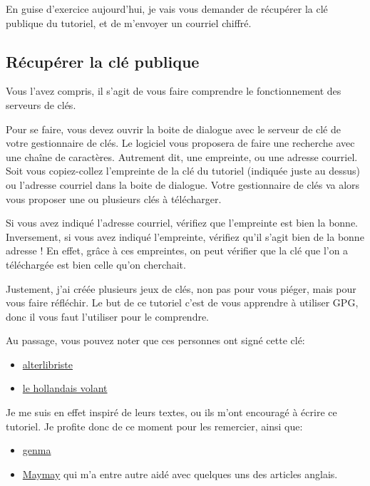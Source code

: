 En guise d'exercice aujourd'hui, je vais vous demander de récupérer la
clé publique du tutoriel, et de m'envoyer un courriel chiffré.

\subsection{Récupérer la clé
publique}\label{ruxe9cupuxe9rer-la-cluxe9-publique}

Vous l'avez compris, il s'agit de vous faire comprendre le
fonctionnement des serveurs de clés.

Pour se faire, vous devez ouvrir la boite de dialogue avec le serveur de
clé de votre gestionnaire de clés. Le logiciel vous proposera de faire
une recherche avec une chaîne de caractères. Autrement dit, une
empreinte, ou une adresse courriel. Soit vous copiez-collez l'empreinte de la clé du tutoriel (indiquée
juste au dessus) ou l'adresse courriel dans la boite de dialogue. Votre gestionnaire de clés va alors vous proposer une ou plusieurs clés
à télécharger.

Si vous avez indiqué l'adresse courriel, vérifiez que l'empreinte est
bien la bonne. Inversement, si vous avez indiqué l'empreinte, vérifiez
qu'il s'agit bien de la bonne adresse ! En effet, grâce à ces
empreintes, on peut vérifier que la clé que l'on a téléchargée est bien
celle qu'on cherchait.

Justement, j'ai créée plusieurs jeux de clés, non pas pour vous piéger,
mais pour vous faire réfléchir. Le but de ce tutoriel c'est de vous apprendre à utiliser GPG, donc il
vous faut l'utiliser pour le comprendre.

Au passage, vous pouvez noter que ces personnes ont signé cette clé:

\begin{itemize}
\itemsep1pt\parskip0pt
\item
  \href{http://alterlibriste.free.fr/}{alterlibriste}
\item
  \href{http://lehollandaisvolant.net/}{le hollandais volant}
\end{itemize}

Je me suis en effet inspiré de leurs textes, ou ils m'ont encouragé à
écrire ce tutoriel. Je profite donc de ce moment pour les remercier,
ainsi que:

\begin{itemize}
\itemsep1pt\parskip0pt
\item
  \href{http://genma.free.fr/}{genma}
\item
  \href{https://maymay.net/}{Maymay} qui m'a entre autre aidé avec
  quelques uns des articles anglais.
\end{itemize}

